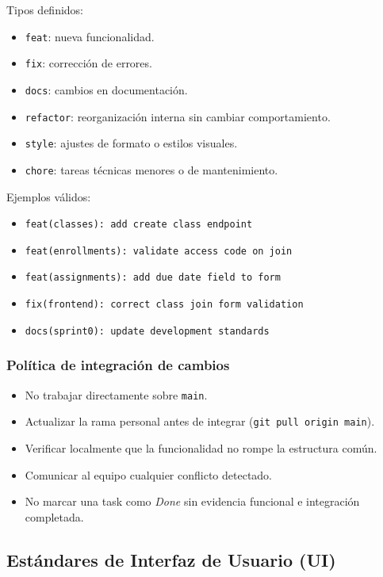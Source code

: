 \documentclass[12pt,a4paper]{article}
\begin{document}
Tipos definidos:

\begin{itemize}
    \item \texttt{feat}: nueva funcionalidad.
    \item \texttt{fix}: corrección de errores.
    \item \texttt{docs}: cambios en documentación.
    \item \texttt{refactor}: reorganización interna sin cambiar comportamiento.
    \item \texttt{style}: ajustes de formato o estilos visuales.
    \item \texttt{chore}: tareas técnicas menores o de mantenimiento.
\end{itemize}

Ejemplos válidos:
\begin{itemize}
    \item \texttt{feat(classes): add create class endpoint}
    \item \texttt{feat(enrollments): validate access code on join}
    \item \texttt{feat(assignments): add due date field to form}
    \item \texttt{fix(frontend): correct class join form validation}
    \item \texttt{docs(sprint0): update development standards}
\end{itemize}

\subsubsection*{Política de integración de cambios}

\begin{itemize}
    \item No trabajar directamente sobre \texttt{main}.
    \item Actualizar la rama personal antes de integrar (\texttt{git pull origin main}).
    \item Verificar localmente que la funcionalidad no rompe la estructura común.
    \item Comunicar al equipo cualquier conflicto detectado.
    \item No marcar una task como \textit{Done} sin evidencia funcional e integración completada.
\end{itemize}

\subsection{Estándares de Interfaz de Usuario (UI)}
\end{document}
